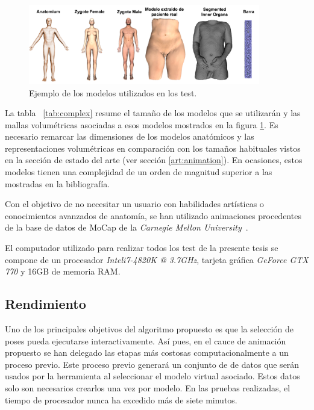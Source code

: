 \begin{figure}[h]%
  \centering
  \includegraphics[width=0.90\textwidth]{IMG/modelos}
    \caption{Ejemplo de los modelos utilizados en los test.}
    \label{fig:models}
\end{figure}

La tabla ~\ref{tab:complex} resume el tamaño de los modelos que se utilizarán y las mallas volumétricas asociadas a esos modelos mostrados en la figura \ref{fig:models}. Es necesario remarcar las dimensiones de los modelos anatómicos y las representaciones volumétricas en comparación con los tamaños habituales vistos en la sección de estado del arte (ver sección \ref{art:animation}). En ocasiones, estos modelos tienen una complejidad de un orden de magnitud superior a las mostradas en la bibliografía.

Con el objetivo de no necesitar un usuario con habilidades artísticas o conocimientos avanzados de anatomía, se han utilizado animaciones procedentes de la base de datos de \ac{MoCap} de la \emph{Carnegie Mellon University}~\cite{CMUMCD}.

El computador utilizado para realizar todos los test de la presente tesis se compone de un procesador \emph{Intel\textregistered i7-4820K @ 3.7GHz}, tarjeta gráfica \emph{GeForce GTX 770} y 16GB de memoria \acs{RAM}.


\subsection{Rendimiento}

Uno de los principales objetivos del algoritmo propuesto es que la selección de poses pueda ejecutarse interactivamente. Así pues, en el cauce de animación propuesto se han delegado las etapas más costosas computacionalmente a un proceso previo. Este proceso previo generará un conjunto de de datos que serán usados por la herramienta al seleccionar el modelo virtual asociado. Estos datos solo son necesarios crearlos una vez por modelo. En las pruebas realizadas, el tiempo de procesador nunca ha excedido más de siete minutos. 


